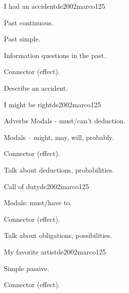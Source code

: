 \begin{syllabus}
\begin{unit}{I had an accident}{}{de2002marco}{12}{5}
   \begin{topics}
      \item Past continuous.
      \item Past simple.
      \item Information questions in the past.
      \item Connector (effect).
   \end{topics}

   \begin{learningoutcomes}
      \item Describe an accident.
   \end{learningoutcomes}
\end{unit}

\begin{unit}{I might be right}{}{de2002marco}{12}{5}
   \begin{topics}
      \item Adverbs Modals - must/can’t deduction.
      \item Modals – might, may, will, probably.
      \item Connector (effect).
   \end{topics}

   \begin{learningoutcomes}
      \item Talk about deductions, probabilities. 
   \end{learningoutcomes}
\end{unit}

\begin{unit}{Call of duty}{}{de2002marco}{12}{5}
   \begin{topics}
      \item Modals: must/have to.
      \item Connector (effect).
   \end{topics}

   \begin{learningoutcomes}
      \item Talk about obligations, possibilities.
   \end{learningoutcomes}
\end{unit}

\begin{unit}{My favorite artist}{}{de2002marco}{12}{5}
   \begin{topics}
      \item Simple passive.
      \item Connector (effect).
   \end{topics}


\end{unit}
\end{syllabus}
